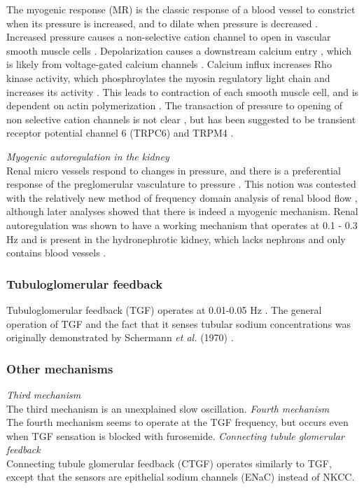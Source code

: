 			 The myogenic response (MR) is the classic response of a blood vessel to constrict when its pressure is increased, and to dilate when pressure is decreased \cite{Bayliss02}. Increased pressure causes a non-selective cation channel to open in vascular smooth muscle cells \cite{Davis92}. Depolarization causes a downstream calcium entry \cite{Kotecha05}, which is likely from voltage-gated calcium channels \cite{Knot98}. Calcium influx increases Rho kinase activity, which phosphroylates the myosin regulatory light chain and increases its activity \cite{Schubert02}. This leads to contraction of each smooth muscle cell, and is dependent on actin polymerization \cite{Gokina02}. The transaction of pressure to opening of non selective cation channels is not clear \cite{Hill07}, but has been suggested to be transient receptor potential channel 6 (TRPC6) \cite{Welsh02} and TRPM4 \cite{Earley04}. 


\emph{Myogenic autoregulation in the kidney}\\
	
	Renal micro vessels respond to changes in pressure, and there is a preferential response of the preglomerular vasculature to pressure \cite{Gilmore80}. This notion was contested with the relatively new method of frequency domain analysis of renal blood flow \cite{Sakai86}, although later analyses showed that there is indeed a myogenic mechanism. Renal autoregulation was shown to have a working mechanism that operates at 0.1 - 0.3 Hz and is present in the hydronephrotic kidney, which lacks nephrons and only contains blood vessels \cite{Cupples98}. 
			
			
		\subsubsection{Tubuloglomerular feedback}
		
		Tubuloglomerular feedback (TGF) operates at 0.01-0.05 Hz \cite{Leyssac83,HolsteinRathlou86}. The general operation of TGF and the fact that it senses tubular sodium concentrations was originally demonstrated by Schermann \emph{et al.} (1970) \cite{Schnermann70}.
		
		\subsubsection{Other mechanisms}
			\emph{Third mechanism}\\
			The third mechanism is an unexplained slow oscillation.
			\emph{Fourth mechanism}\\
			The fourth mechanism seems to operate at the TGF frequency, but occurs even when TGF sensation is blocked with furosemide.
			\emph{Connecting tubule glomerular feedback}\\
			Connecting tubule glomerular feedback (CTGF) operates similarly to TGF, except that the sensors are epithelial sodium channels (ENaC) instead of NKCC.
